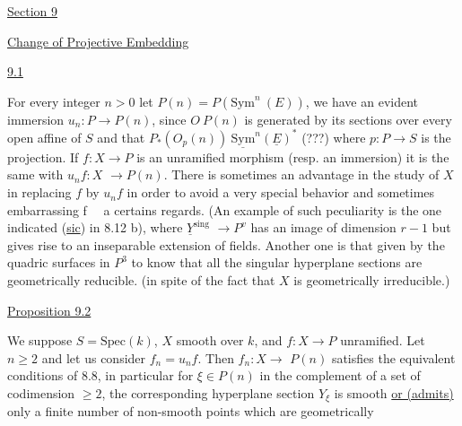 
\uline{Section 9}

\uline{Change of Projective Embedding}

\uline{9.1}

For every integer $n > 0$ let $P(n) = P(\mathrm{Sym}^{n}\ (E))$, we have an
evident immersion $u_{n}\colon P \to P(n)$, since $O\ P(n)$ is generated by its
sections over every open affine of $S$ and that $P_{*}(O_{p}(n))\ \underline{\mathrm{Sym}}^{n}(\underline{E})^{*}$
(???) where $p\colon P \to S$ is the projection.  If $f\colon X \to P$ is an
unramified morphism (resp. an immersion) it is the same with $u_{n}f\colon X$
$\to P(n)$.  There is sometimes an advantage in the study of $X$ in
replacing $f$ by $u_{n}f$ in order to avoid a very special behavior and
sometimes embarrassing f \ \ a certains regards.  (An example of
such peculiarity is the one indicated (\uline{sic}) in 8.12 b), where $\underline{Y}^{\mathrm{sing}}$
$\to P^{v}$ has an image of dimension $r - 1$ but gives rise to an
inseparable extension of fields.  Another one is that given by the
quadric surfaces in $P^{3}$ to know that all the singular hyperplane
sections are geometrically reducible.  (in spite of the fact that
$X$ is geometrically irreducible.)

\uline{Proposition 9.2}

We suppose $S = \mathrm{Spec}(k)$, $X$ smooth over $k$, and $f\colon X \to P$
unramified.  Let $n \geq 2$ and let us consider $f_{n} = u_{n}f$.  Then $f_{n}\colon X \to$
$P(n)$ satisfies the equivalent conditions of 8.8, in particular for
$\xi \in P(n)$ in the complement of a set of codimension $\geq 2$, the
corresponding hyperplane section $Y_{\xi}$ is smooth \uline{or (admits)} only a
finite number of non-smooth points which are geometrically


